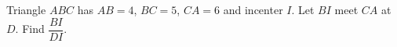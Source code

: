 Triangle $ABC$ has $AB=4$, $BC=5$, $CA=6$ and incenter $I$. Let $BI$ meet $CA$ at $D$. Find $\dfrac{BI}{DI}$.
